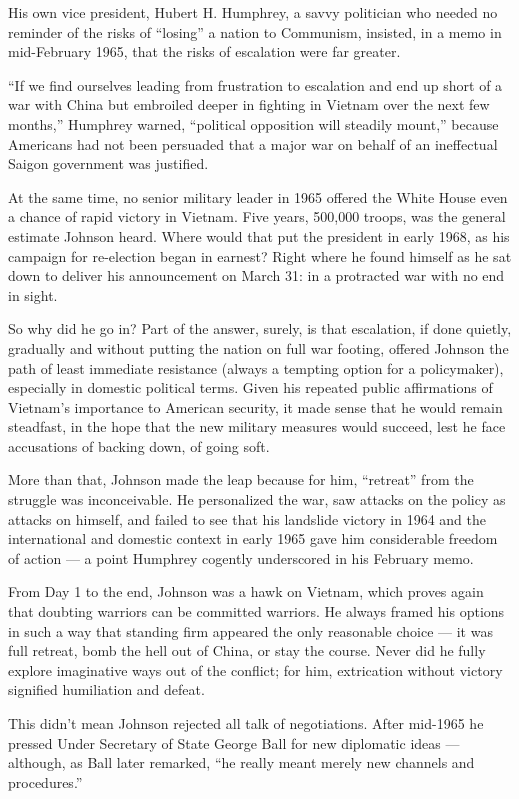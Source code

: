 His own vice president, Hubert H. Humphrey, a savvy politician who
needed no reminder of the risks of ``losing'' a nation to Communism,
insisted, in a memo in mid-February 1965, that the risks of escalation
were far greater.

``If we find ourselves leading from frustration to escalation and end up
short of a war with China but embroiled deeper in fighting in Vietnam
over the next few months,'' Humphrey warned, ``political opposition will
steadily mount,'' because Americans had not been persuaded that a major
war on behalf of an ineffectual Saigon government was justified.

At the same time, no senior military leader in 1965 offered the White
House even a chance of rapid victory in Vietnam. Five years, 500,000
troops, was the general estimate Johnson heard. Where would that put the
president in early 1968, as his campaign for re-election began in
earnest? Right where he found himself as he sat down to deliver his
announcement on March 31: in a protracted war with no end in sight.

So why did he go in? Part of the answer, surely, is that escalation, if
done quietly, gradually and without putting the nation on full war
footing, offered Johnson the path of least immediate resistance (always
a tempting option for a policymaker), especially in domestic political
terms. Given his repeated public affirmations of Vietnam's importance to
American security, it made sense that he would remain steadfast, in the
hope that the new military measures would succeed, lest he face
accusations of backing down, of going soft.

More than that, Johnson made the leap because for him, ``retreat'' from
the struggle was inconceivable. He personalized the war, saw attacks on
the policy as attacks on himself, and failed to see that his landslide
victory in 1964 and the international and domestic context in early 1965
gave him considerable freedom of action --- a point Humphrey cogently
underscored in his February memo.

From Day 1 to the end, Johnson was a hawk on Vietnam, which proves again
that doubting warriors can be committed warriors. He always framed his
options in such a way that standing firm appeared the only reasonable
choice --- it was full retreat, bomb the hell out of China, or stay the
course. Never did he fully explore imaginative ways out of the conflict;
for him, extrication without victory signified humiliation and defeat.

This didn't mean Johnson rejected all talk of negotiations. After
mid-1965 he pressed Under Secretary of State George Ball for new
diplomatic ideas --- although, as Ball later remarked, ``he really meant
merely new channels and procedures.''

